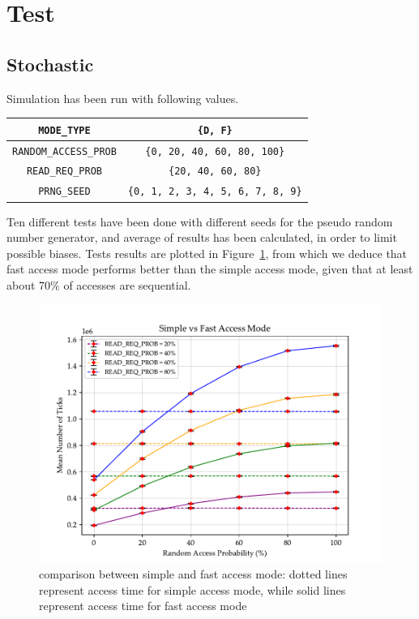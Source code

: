 \documentclass[a4paper,12pt]{article}
\begin{document}
\section{Test}
\subsection{Stochastic}
Simulation has been run with following values.

\begin{table}[H]
\center
\begin{tabular}{| c | c |}\hline
\texttt{MODE\_TYPE} & \texttt{\{D, F\}} \\ \hline
\texttt{RANDOM\_ACCESS\_PROB} & \texttt{\{0, 20, 40, 60, 80, 100\}} \\ \hline
\texttt{READ\_REQ\_PROB} & \texttt{\{20, 40, 60, 80\}} \\ \hline
\texttt{PRNG\_SEED} & \texttt{\{0, 1, 2, 3, 4, 5, 6, 7, 8, 9\}} \\ \hline
\end{tabular}
\end{table}

Ten different tests have been done with different seeds for the pseudo random number generator, and average of results has been calculated, in order to limit possible biases.
Tests results are plotted in Figure~\ref{fig:test-simple-vs-fast}, from which we deduce that fast access mode performs better than the simple access mode, given that at least about 70\% of accesses are sequential.

\begin{figure}
  \includegraphics{img/test-simple-vs-fast.pdf}
  \caption{comparison between simple and fast access mode: dotted lines represent access time for simple access mode, while solid lines represent access time for fast access mode}
  \label{fig:test-simple-vs-fast}
\end{figure}
\end{document}
